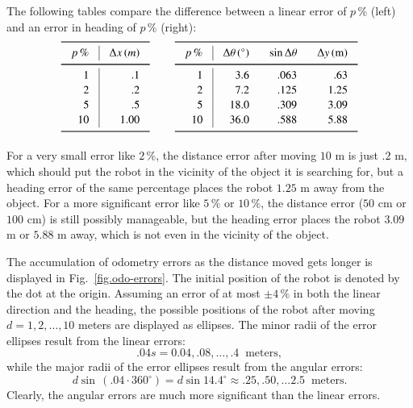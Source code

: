 The following tables compare the difference between a linear error of $p\,\%$ (left) and an error in heading of $p\,\%$ (right):
\begin{displaymath}
\setlength{\arraycolsep}{2ex}
\renewcommand{\arraystretch}{1.1}
\begin{array}{r|r}
\svhline\noalign{\smallskip}
\multicolumn{1}{c|}{p\,\%} & \multicolumn{1}{c}{\Delta x \,(m)}\\
\noalign{\smallskip}\svhline\noalign{\smallskip}
1 & .1 \\
2 & .2 \\
5 & .5 \\
10 & 1.00\\
\noalign{\smallskip}\svhline\noalign{\smallskip}
\end{array}
\;\;\;\;\;\;\;\;
\begin{array}{r|rrr}
\svhline\noalign{\smallskip}
\multicolumn{1}{c|}{p\,\%} & \multicolumn{1}{c}{\Delta \theta\,({}^\circ)} & \multicolumn{1}{c}{\sin\Delta\theta} & \multicolumn{1}{c}{\Delta y \,(\textrm{m})}\\
\noalign{\smallskip}\svhline\noalign{\smallskip}
1 &  3.6 & .063 & .63\\
2 &  7.2 & .125 & 1.25\\
5 &  18.0 & .309 & 3.09\\
10 & 36.0 & .588 & 5.88\\
\noalign{\smallskip}\svhline\noalign{\smallskip}
\end{array}
\end{displaymath}

For a very small error like $2\,\%$, the distance error after moving $10$ m is just $.2$ m, which should put the robot in the vicinity of the object it is searching for, but a heading error of the same percentage places the robot $1.25$ m away from the object. For a more significant error like $5\,\%$ or $10\,\%$, the distance error ($50$ cm or $100$ cm) is still possibly manageable, but the heading error places the robot $3.09$ m or $5.88$ m away, which is not even in the vicinity of the object.

The accumulation of odometry errors as the distance moved gets longer is displayed in Fig.~\ref{fig.odo-errors}. The initial position of the robot is denoted by the dot at the origin.  Assuming an error of at most $\pm 4\,\%$ in both the linear direction and the heading, the possible positions of the robot after moving $d=1,2,\ldots,10$ meters are displayed as ellipses. The minor radii of the error ellipses result from the linear errors:
\[.04s = 0.04, .08, \ldots, .4 \;\;\textrm{meters},
\]
while the major radii of the error ellipses result from the angular errors:
\[
d\sin \,(.04\cdot 360^\circ)=d \sin 14.4^\circ \approx{} .25, .50, \ldots 2.5\;\;\textrm{meters}.
\]
Clearly, the angular errors are much more significant than the linear errors.

